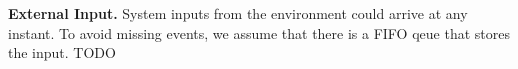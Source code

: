 {\bf External Input.} 
System inputs from the environment could arrive at any instant. To avoid missing events, we assume that there is a FIFO qeue that stores the input. TODO %

%
%







